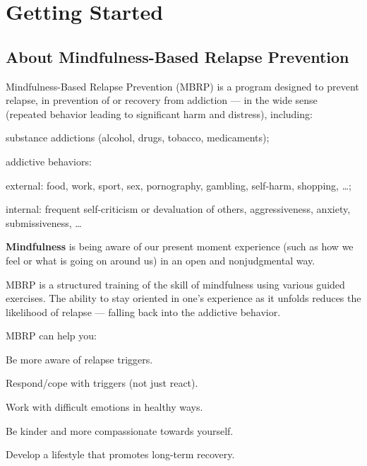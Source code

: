 \bgroup
	\cleardoublepage
	\setcounter{section}{-1}
	\titleformat{\section}[frame]{}{}{1em}{\Large\scshape\bfseries}
	\section{Getting Started}
\egroup	



\subsection{About Mindfulness-Based Relapse Prevention}

	Mindfulness-Based Relapse Prevention (MBRP) is a program designed to prevent relapse, in prevention of or recovery from addiction — in the wide sense (repeated behavior leading to significant harm and distress), including:
	\begin{itemize*}
		\item substance addictions (alcohol, drugs, tobacco, medicaments);
		\item addictive behaviors:
			\begin{itemize*}
				\item external: food, work, sport, sex, pornography, gambling, self-harm, shopping, …;
				\item  internal: frequent self-criticism or devaluation of others, aggressiveness, anxiety, submissiveness, …
			\end{itemize*}
	\end{itemize*}

	\textbf{Mindfulness} is being aware of our present moment experience (such as how we feel or what is going on around us) in an open and nonjudgmental way.

	MBRP is a structured training of the skill of mindfulness using various guided exercises. The ability to stay oriented in one’s experience as it unfolds reduces the likelihood of relapse — falling back into the addictive behavior.

	\clearpage
	MBRP can help you:
	\begin{itemize*}
		\item Be more aware of relapse triggers.
		\item Respond/cope with triggers (not just react).
		\item Work with difficult emotions in healthy ways.
		\item Be kinder and more compassionate towards yourself.
		\item Develop a lifestyle that promotes long-term recovery.
	\end{itemize*}


